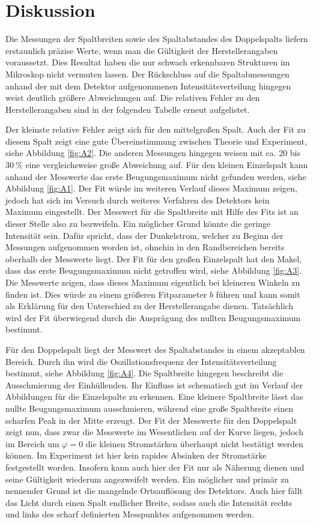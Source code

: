 \section{Diskussion}
\label{sec:Diskussion}
Die Messungen der Spaltbreiten sowie des Spaltabstandes des Doppelspalts liefern erstaunlich präzise Werte, wenn man die Gültigkeit der Herstellerangaben voraussetzt. Dies Resultat haben die nur schwach erkennbaren Strukturen im Mikroskop nicht vermuten lassen. Der Rückschluss auf die Spaltabmessungen anhand der mit dem Detektor aufgenommenen Intensitätsverteilung hingegen weist deutlich größere Abweichungen auf. Die relativen Fehler zu den Herstellerangaben sind in der folgenden Tabelle erneut aufgelistet.

Der kleinste relative Fehler zeigt sich für den mittelgroßen Spalt. Auch der Fit zu diesem Spalt zeigt eine gute Übereinstimmung zwischen Theorie und Experiment, siehe Abbildung \ref{fig:A2}. Die anderen Messungen hingegen weisen mit ca. 20 bis $\SI{30}{\percent}$ eine vergleichsweise große Abweichung auf. Für den kleinen Einzelspalt kann anhand der Messwerte das erste Beugungsmaximum nicht gefunden werden, siehe Abbildung \ref{fig:A1}. Der Fit würde im weiteren Verlauf dieses Maximum zeigen, jedoch hat sich im Versuch durch weiteres Verfahren des Detektors kein Maximum eingestellt. Der Messwert für die Spaltbreite mit Hilfe des Fits ist an dieser Stelle also zu bezweifeln. Ein möglicher Grund könnte die geringe Intensität sein. Dafür spricht, dass der Dunkelstrom, welcher zu Beginn der Messungen aufgenommen worden ist, ohnehin in den Randbereichen bereits oberhalb der Messwerte liegt. Der Fit für den großen Einzelspalt hat den Makel, dass das erste Beugungsmaximum nicht getroffen wird, siehe Abbildung \ref{fig:A3}. Die Messwerte zeigen, dass dieses Maximum eigentlich bei kleineren Winkeln zu finden ist. Dies würde zu einem größeren Fitparameter $b$ führen und kann somit als Erklärung für den Unterschied zu der Herstellerangabe dienen. Tatsächlich wird der Fit überwiegend durch die Ausprägung des nullten Beugungsmaximum bestimmt.

Für den Doppelspalt liegt der Messwert des Spaltabstandes in einem akzeptablen Bereich. Durch ihn wird die Oszillationsfrequenz der Intensitätsverteilung bestimmt, siehe Abbildung \ref{fig:A4}. Die Spaltbreite hingegen beschreibt die Ausschmierung der Einhüllenden. Ihr Einfluss ist schematisch gut im Verlauf der Abbildungen für die Einzelspalte zu erkennen. Eine kleinere Spaltbreite lässt das nullte Beugungsmaximum ausschmieren, während eine große Spaltbreite einen scharfen Peak in der Mitte erzeugt. Der Fit der Messwerte für den Doppelspalt zeigt nun, dass zwar die Messwerte im Wesentlichen auf der Kurve liegen, jedoch im Bereich um $\varphi=0$ die kleinen Stromstärken überhaupt nicht bestätigt werden können. Im Experiment ist hier kein rapides Absinken der Stromstärke festgestellt worden. Insofern kann auch hier der Fit nur als Näherung dienen und seine Gültigkeit wiederum angezweifelt werden. Ein möglicher und primär zu nennender Grund ist die mangelnde Ortsauflösung des Detektors. Auch hier fällt das Licht durch einen Spalt endlicher Breite, sodass auch die Intensität rechts und links des scharf definierten Messpunktes aufgenommen werden.
